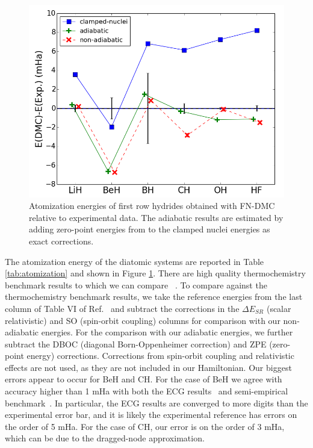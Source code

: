 \documentclass[pra,superscriptaddress,groupedaddress,twocolumn]{revtex4}
\begin{document}
\begin{figure}[h]
\centering
\includegraphics[scale=.4]{Figures/atomization}
\caption{Atomization energies of first row hydrides obtained with FN-DMC relative to experimental data. The adiabatic results are estimated by adding zero-point energies from \cite{Feller_Corrections} to the clamped nuclei energies as exact corrections. \label{fig:atomization}}
\end{figure}

The atomization energy of the diatomic systems are reported in Table \ref{tab:atomization} and shown in Figure \ref{fig:atomization}. There are high quality thermochemistry benchmark results to which we can compare ~\cite{Feller_Corrections}. To compare against the thermochemistry benchmark results, we take the reference energies from the last column of Table VI of Ref.~\cite{Feller_Corrections} and subtract the corrections in the $\Delta E_{SR}$ (scalar relativistic) and SO (spin-orbit coupling) columns for comparison with our non-adiabatic energies. For the comparison with our adiabatic energies, we further subtract the DBOC (diagonal Born-Oppenheimer correction) and ZPE (zero-point energy) corrections. Corrections from spin-orbit coupling and relativistic effects are not used, as they are not included in our Hamiltonian. Our biggest errors appear to occur for BeH and CH. For the case of BeH we agree with accuracy higher than 1 mHa with both the ECG results~\cite{Bubin_BeH_noBO} and semi-empirical benchmark~\cite{Feller_Corrections,Davidson_Atoms}. In particular, the ECG results are converged to more digits than the experimental error bar, and it is likely the experimental reference has errors on the order of 5 mHa. For the case of CH, our error is on the order of 3 mHa, which can be due to the dragged-node approximation. 
\end{document}
